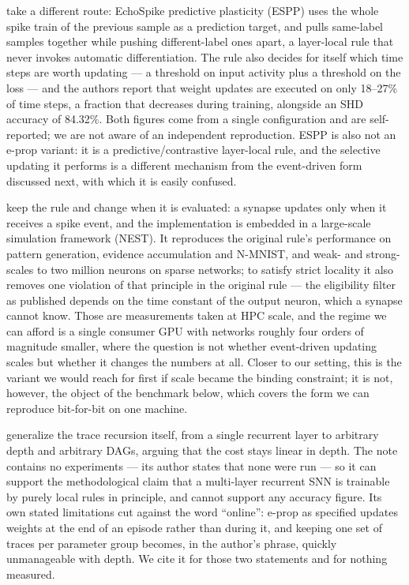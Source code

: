 \documentclass[11pt]{article}
\begin{document}
\citet{espp2024} take a different route: EchoSpike predictive plasticity (ESPP)
uses the whole spike train of the previous sample as a prediction target, and
pulls same-label samples together while pushing different-label ones apart, a
layer-local rule that never invokes automatic differentiation. The rule also
decides for itself which time steps are worth updating --- a threshold on input
activity plus a threshold on the loss --- and the authors report that weight
updates are executed on only 18--27\% of time steps, a fraction that decreases
during training, alongside an SHD accuracy of 84.32\%. Both figures come from a
single configuration and are self-reported; we are not aware of an independent
reproduction. ESPP is also not an e-prop variant: it is a
predictive/contrastive layer-local rule, and the selective updating it performs
is a different mechanism from the event-driven form discussed next, with which
it is easily confused.

\citet{korcsak2025event} keep the rule and change when it is evaluated: a
synapse updates only when it receives a spike event, and the implementation is
embedded in a large-scale simulation framework (NEST). It reproduces the
original rule's performance on pattern generation, evidence accumulation and
N-MNIST, and weak- and strong-scales to two million neurons on sparse networks;
to satisfy strict locality it also removes one violation of that principle in
the original rule --- the eligibility filter as published depends on the time
constant of the output neuron, which a synapse cannot know. Those are
measurements taken at HPC scale, and the regime we can afford is a single
consumer GPU with networks roughly four orders of magnitude smaller, where the
question is not whether event-driven updating scales but whether it changes the
numbers at all. Closer to our setting, this is the variant we would reach for
first if scale became the binding constraint; it is not, however, the object of
the benchmark below, which covers the form we can reproduce bit-for-bit on one
machine.

\citet{millidge2025deep} generalize the trace recursion itself, from a single
recurrent layer to arbitrary depth and arbitrary DAGs, arguing that the cost
stays linear in depth. The note contains no experiments --- its author states
that none were run --- so it can support the methodological claim that a
multi-layer recurrent SNN is trainable by purely local rules in principle, and
cannot support any accuracy figure. Its own stated limitations cut against the
word ``online'': e-prop as specified updates weights at the end of an episode
rather than during it, and keeping one set of traces per parameter group becomes,
in the author's phrase, quickly unmanageable with depth. We cite it for those two
statements and for nothing measured.
\end{document}
